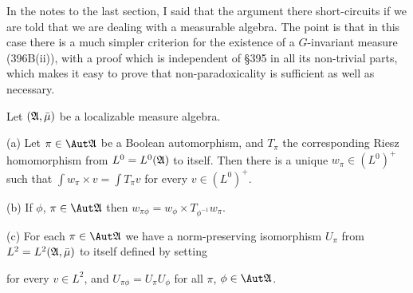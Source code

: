 
\def\chaptername{Measurable algebras}
\def\sectionname{The Hajian-Ito theorem}


In the notes to the last section, I said that the argument there
short-circuits if we are told that we are dealing with a measurable
algebra.   The point is that in this case there is a much simpler
criterion for the existence of a $G$-invariant measure (396B(ii)), with
a proof which is independent of \S395 in all its non-trivial parts,
which makes it easy to prove that non-paradoxicality is sufficient as
well as necessary.

 Let $(\frak A,\bar\mu)$ be a localizable measure
algebra.

(a) Let $\pi\in\Aut\frak A$ be a Boolean automorphism, and $T_{\pi}$ the corresponding
Riesz homomorphism from $L^0=L^0(\frak A)$ to itself.
Then there is a unique $w_{\pi}\in(L^0)^+$ such that $\int w_{\pi}\times
v=\int T_{\pi}v$ for every $v\in(L^0)^+$.

(b) If $\phi$, $\pi\in\Aut\frak A$ then $w_{\pi\phi}=w_{\phi}\times
T_{\phi^{-1}}w_{\pi}$.

(c) For each $\pi\in\Aut\frak A$ we have a norm-preserving isomorphism
$U_{\pi}$ from $L^2=L^2(\frak A,\bar\mu)$ to itself defined by
setting


\noindent for every $v\in L^2$, and $U_{\pi\phi}=U_{\pi}U_{\phi}$ for
all $\pi$, $\phi\in\Aut\frak A$.

